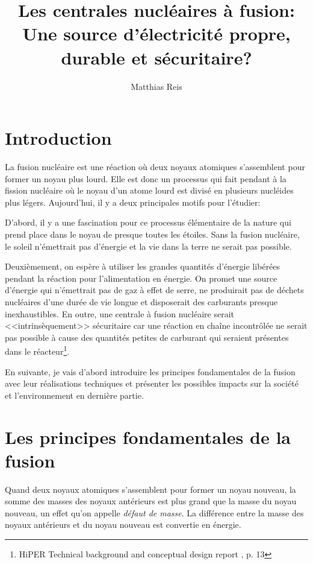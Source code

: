 \documentclass[12pt,a4paper]{article}
\title{Les centrales nucléaires à fusion: Une source d'électricité propre, durable et sécuritaire?}
\author{Matthias Reis}
\begin{document}
\maketitle \newpage
\tableofcontents \newpage

\section{Introduction}
La fusion nucléaire est une réaction où deux noyaux atomiques s'assemblent pour former un noyau plus lourd. Elle est donc un processus qui fait pendant à la fission nucléaire où le noyau d'un atome lourd est divisé en plusieurs nucléides plus légers. Aujourd'hui, il y a deux principales motifs pour l'étudier: %

D'abord, il y a une fascination pour ce processus élémentaire de la nature qui prend place dans le noyau de presque toutes les étoiles. Sans la fusion nucléaire, le soleil n'émettrait pas d'énergie et la vie dans la terre ne serait pas possible.

Deuxièmement, on espère à utiliser les grandes quantités d'énergie libérées pendant la réaction pour l'alimentation en énergie. On promet une source d'énergie qui n'émettrait pas de gaz à effet de serre, ne produirait pas de déchets nucléaires d'une durée de vie longue et disposerait des carburants presque inexhaustibles. En outre, une centrale à fusion nucléaire serait <<intrinsèquement>> sécuritaire car une réaction en chaîne incontrôlée ne serait pas possible à cause des quantités petites de carburant qui seraient présentes dans le réacteur\footnote{HiPER Technical background and conceptual design report \cite{hiper}, p. 13}.

En suivante, je vais d'abord introduire les principes fondamentales de la fusion avec leur réalisations techniques et présenter les possibles impacts sur la société et l'environnement en dernière partie. 

\section{Les principes fondamentales de la fusion}
Quand deux noyaux atomiques s'assemblent pour former un noyau nouveau, la somme des masses des noyaux antérieurs est plus grand que la masse du noyau nouveau, un effet qu'on appelle \textit{défaut de masse}. La différence entre la masse des noyaux antérieurs et du noyau nouveau est convertie en énergie.
\end{document}
